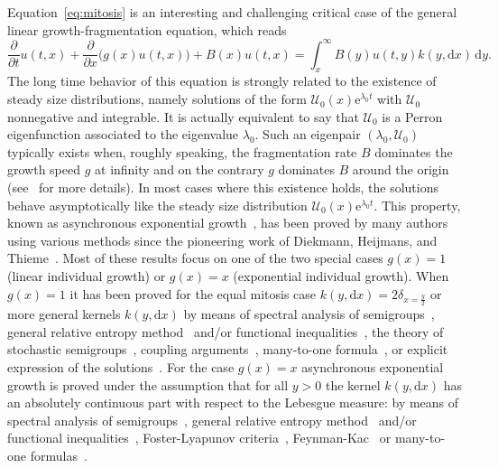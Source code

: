 \documentclass[10pt]{amsart}
\theoremstyle{definition}\newtheorem{defi}[theo]{Definition}\newtheorem{rema}[theo]{Remark}\newtheorem{exam}[theo]{Example}\newtheorem{exem}[theo]{Example}\newtheorem{nota}[theo]{Notation}
\newcommand{\dis}{\displaystyle}
\newcommand{\p}{\partial}
\newcommand{\ddt}{\frac{\p}{\p t}}
\newcommand{\ddx}{\frac{\p}{\p x}}
\newcommand{\Ucal}{\mathcal{U}}
\newcommand{\1}{\mathds{1}}
\newcommand{\e}{\mathrm{e}}
\renewcommand{\d}{\mathrm{d}}
\begin{document}
Equation~\eqref{eq:mitosis} is an interesting and challenging critical case of the general linear growth-fragmentation equation, which reads
\[
\dis \ddt u(t,x) + \ddx \big(g(x)u(t,x)\big) + B(x)u(t,x) = \int_x^\infty B(y)u(t,y)k(y,\d x)\,\d y.
\]
The long time behavior of this equation is strongly related to the existence of steady size distributions, namely solutions of the form $\Ucal_0(x)\e^{\lambda_0 t}$ with $\Ucal_0$ nonnegative and integrable. It is actually equivalent to say that $\Ucal_0$ is a Perron eigenfunction associated to the eigenvalue $\lambda_0$. Such an eigenpair $(\lambda_0,\Ucal_0)$ typically exists when, roughly speaking, the fragmentation rate $B$ dominates the growth speed $g$ at infinity and on the contrary $g$ dominates $B$ around the origin (see~\cite{DoumicEscobedo,DG,Doumic2018} for more details). In most cases where this existence holds, the solutions behave asymptotically like the steady size distribution $\Ucal_0(x)\e^{\lambda_0 t}.$ This property, known as asynchronous exponential growth~\cite{WebbGrabosch}, has been proved by many authors using various methods since the pioneering work of Diekmann, Heijmans, and Thieme~\cite{Diekmann1984}. Most of these results focus on one of the two special cases $g(x)=1$ (linear individual growth) or $g(x)=x$ (exponential individual growth). When $g(x)=1$ it has been proved for the equal mitosis case $k(y,\d x)=2\delta_{x=\frac y2}$ or more general kernels $k(y,\d x)$ by means of spectral analysis of semigroups~\cite{BernardGabriel2,Diekmann1984,GreinerNagel,Heijmans1984,MischlerScher}, general relative entropy method~\cite{Debiec2018,Michel2005} and/or functional inequalities~\cite{Balague2013,Caceres2011,LaurencotPerthame,Monmarche,Pakdaman2014,PerthameRhyzik}, the theory of stochastic semigroups~\cite{Bansaye2019,Broda,Bouguet,BanasiakPichorRudnicki,CanizoYoldas,CanizoGabrielYoldas,RudnickiPichor}, coupling arguments~\cite{BCGMZ,ChafaiMalrieuParoux,Malrieu}, many-to-one formula~\cite{Cloez}, or explicit expression of the solutions~\cite{Zaidi2015}. For the case $g(x)=x$ asynchronous exponential growth is proved under the assumption that for all $y>0$ the kernel $k(y,\d x)$ has an absolutely continuous part with respect to the Lebesgue measure: by means of spectral analysis of semigroups~\cite{BernardGabriel2,Heijmans1984,MischlerScher}, general relative entropy method~\cite{Escobedo2005,Michel2005} and/or functional inequalities~\cite{Balague2013,Caceres2010,Caceres2011,GabrielSalvarani}, Foster-Lyapunov criteria~\cite{Bouguet,CanizoGabrielYoldas}, Feynman-Kac~\cite{Bertoin2019,BertoinWatson2018,BertoinWatson2019,Cavalli} or many-to-one formulas~\cite{Marguet2}.
\end{document}

